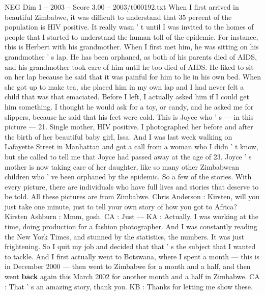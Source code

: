 \begin{textsample}{NEG Dim 1 – 2003 – Score 3.00 – 2003/t000192.txt}  \label{ex:f1_neg_078}
When I first arrived in beautiful Zimbabwe, it was difficult to understand that 35 percent of the population is HIV positive.
It really wasn ' t until I was invited to the homes of people that I started to understand the human toll of the epidemic.
For instance, this is Herbert with his grandmother.
When I first met him, he was sitting on his grandmother ' s lap.
He has been orphaned, as both of his parents died of AIDS, and his grandmother took care of him until he too died of AIDS.
He liked to sit on her lap because he said that it was painful for him to lie in his own bed.
When she got up to make tea, she placed him in my own lap and I had never felt a child that was that emaciated.
Before I left, I actually asked him if I could get him something.
I thought he would ask for a toy, or candy, and he asked me for slippers, because he said that his feet were cold.
This is Joyce who ' s — in this picture — 21.
Single mother, HIV positive.
I photographed her before and after the birth of her beautiful baby girl, Issa.
And I was last week walking on Lafayette Street in Manhattan and got a call from a woman who I didn ' t know, but she called to tell me that Joyce had passed away at the age of 23.
Joyce ' s mother is now taking care of her daughter, like so many other Zimbabwean children who ' ve been orphaned by the epidemic.
So a few of the stories.
With every picture, there are individuals who have full lives and stories that deserve to be told.
All these pictures are from Zimbabwe.
Chris Anderson : Kirsten, will you just take one minute, just to tell your own story of how you got to Africa?
Kirsten Ashburn : Mmm, gosh.
CA : Just — KA : Actually, I was working at the time, doing production for a fashion photographer.
And I was constantly reading the New York Times, and stunned by the statistics, the numbers.
It was just frightening.
So I quit my job and decided that that ' s the subject that I wanted to tackle.
And I first actually went to Botswana, where I spent a month — this is in December 2000 — then went to Zimbabwe for a month and a half, and then went \textbf{back} again this March 2002 for another month and a half in Zimbabwe.
CA : That ' s an amazing story, thank you.
KB : Thanks for letting me show these.

\end{textsample}
